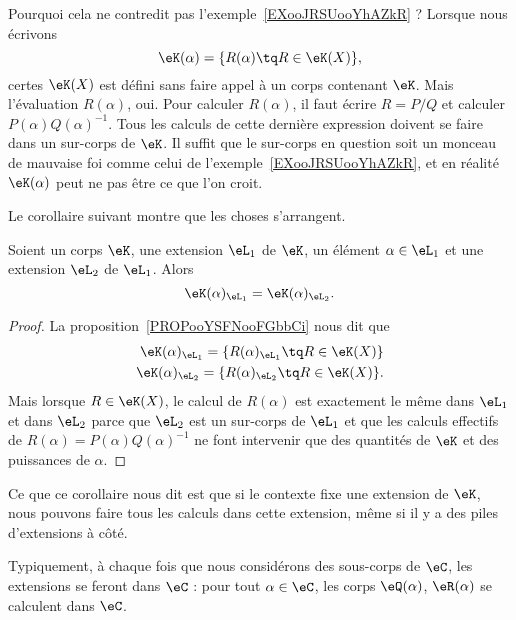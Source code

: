 Pourquoi cela ne contredit pas l'exemple~\ref{EXooJRSUooYhAZkR} ? Lorsque nous écrivons
\begin{equation}
    \eK(\alpha)=\{ R(\alpha)\tq R\in \eK(X) \},
\end{equation}
certes \( \eK(X)\) est défini sans faire appel à un corps contenant \( \eK\). Mais l'évaluation \( R(\alpha)\), oui. Pour calculer \( R(\alpha)\), il faut écrire \( R=P/Q\) et calculer \( P(\alpha)Q(\alpha)^{-1}\). Tous les calculs de cette dernière expression doivent se faire dans un sur-corps de \( \eK\). Il suffit que le sur-corps en question soit un monceau de mauvaise foi comme celui de l'exemple~\ref{EXooJRSUooYhAZkR}, et en réalité \( \eK(\alpha)\) peut ne pas être ce que l'on croit.

Le corollaire suivant montre que les choses s'arrangent.

\begin{corollary}
    Soient un corps \( \eK\), une extension \( \eL_1\) de \( \eK\), un élément \( \alpha\in \eL_1\) et une extension \( \eL_2\) de \( \eL_1\). Alors
    \begin{equation}
        \eK(\alpha)_{\eL_1}=\eK(\alpha)_{\eL_2}.
    \end{equation}
\end{corollary}

\begin{proof}
    La proposition~\ref{PROPooYSFNooFGbbCi} nous dit que
    \begin{subequations}
        \begin{align}
            \eK(\alpha)_{\eL_1}=\{ R(\alpha)_{\eL_1}\tq R\in\eK(X) \}\\
            \eK(\alpha)_{\eL_2}=\{ R(\alpha)_{\eL_2}\tq R\in\eK(X) \}.
        \end{align}
    \end{subequations}
    Mais lorsque \( R\in \eK(X)\), le calcul de \( R(\alpha)\) est exactement le même dans \( \eL_1\) et dans \( \eL_2\) parce que \( \eL_2\) est un sur-corps de \( \eL_1\) et que les calculs effectifs de \( R(\alpha)=P(\alpha)Q(\alpha)^{-1}\) ne font intervenir que des quantités de \( \eK\) et des puissances de \( \alpha\).
\end{proof}

Ce que ce corollaire nous dit est que si le contexte fixe une extension de \( \eK\), nous pouvons faire tous les calculs dans cette extension, même si il y a des piles d'extensions à côté.

Typiquement, à chaque fois que nous considérons des sous-corps de \( \eC\), les extensions se feront dans \( \eC\) : pour tout \( \alpha\in \eC\), les corps \( \eQ(\alpha)\), \( \eR(\alpha)\) se calculent dans \( \eC\).

